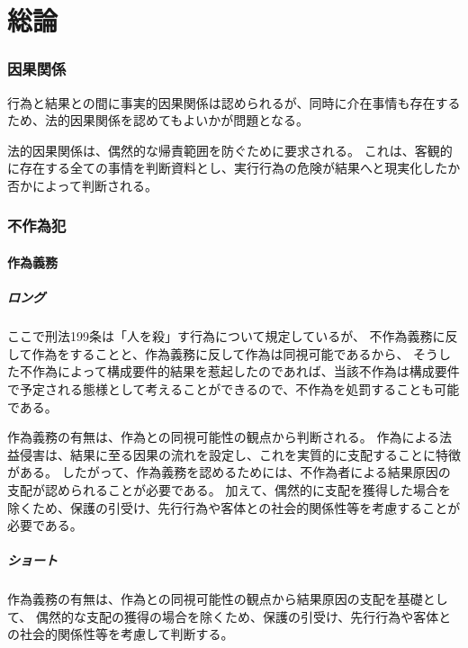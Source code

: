 \documentclass[11pt]{jsarticle}
\title{\vspace{-30mm}{\textgt{\Large{刑法論証集}}}}
\date{\vspace{-15mm}}
\begin{document}
\maketitle
\tableofcontents
\clearpage

\part{総論}

	\section{因果関係}
		行為と結果との間に事実的因果関係は認められるが、同時に介在事情も存在するため、法的因果関係を認めてもよいかが問題となる。
		
		法的因果関係は、偶然的な帰責範囲を防ぐために要求される。
		これは、客観的に存在する全ての事情を判断資料とし、実行行為の危険が結果へと現実化したか否かによって判断される。
		
	\section{不作為犯}
		\subsection{作為義務}
			\subsubsection{ロング}
				ここで刑法199条は「人を殺」す行為について規定しているが、
				不作為義務に反して作為をすることと、作為義務に反して作為は同視可能であるから、
				そうした不作為によって構成要件的結果を惹起したのであれば、当該不作為は構成要件で予定される態様として考えることができるので、不作為を処罰することも可能である。
		
				作為義務の有無は、作為との同視可能性の観点から判断される。
				作為による法益侵害は、結果に至る因果の流れを設定し、これを実質的に支配することに特徴がある。
				したがって、作為義務を認めるためには、不作為者による結果原因の支配が認められることが必要である。
				加えて、偶然的に支配を獲得した場合を除くため、保護の引受け、先行行為や客体との社会的関係性等を考慮することが必要である。
			
			\subsubsection{ショート}
				作為義務の有無は、作為との同視可能性の観点から結果原因の支配を基礎として、
				偶然的な支配の獲得の場合を除くため、保護の引受け、先行行為や客体との社会的関係性等を考慮して判断する。
	
\end{document}
